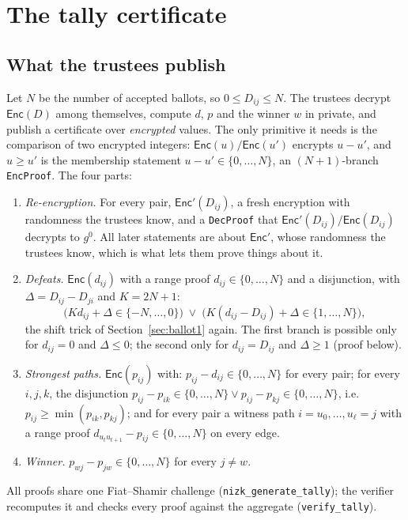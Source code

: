 \documentclass[11pt,a4paper]{article}
\newcommand{\Enc}{\mathsf{Enc}}
\newcommand{\rocq}[1]{\texttt{#1}}
\theoremstyle{remark}
\begin{document}
\section{The tally certificate}\label{sec:tally}

\subsection{What the trustees publish}
Let $N$ be the number of accepted ballots, so $0 \le D_{ij} \le N$. The
trustees decrypt $\Enc(D)$ among themselves, compute $d$, $p$ and the
winner $w$ in private, and publish a certificate over \emph{encrypted}
values. The only primitive it needs is the comparison of two encrypted
integers: $\Enc(u) / \Enc(u')$ encrypts $u - u'$, and $u \ge u'$ is the
membership statement $u - u' \in \{0, \ldots, N\}$, an $(N+1)$-branch
\rocq{EncProof}. The four parts:
\begin{enumerate}[nosep]
  \item[(i)] \emph{Re-encryption.} For every pair, $\Enc'(D_{ij})$, a fresh
  encryption with randomness the trustees know, and a \rocq{DecProof} that
  $\Enc'(D_{ij}) / \Enc(D_{ij})$ decrypts to $g^0$. All later statements
  are about $\Enc'$, whose randomness the trustees know, which is what
  lets them prove things about it.
  \item[(ii)] \emph{Defeats.} $\Enc(d_{ij})$ with a range proof $d_{ij} \in
  \{0, \ldots, N\}$ and a disjunction, with $\Delta = D_{ij} - D_{ji}$ and
  $K = 2N + 1$:
  \[
    \big(K d_{ij} + \Delta \in \{-N, \ldots, 0\}\big) \;\vee\;
    \big(K (d_{ij} - D_{ij}) + \Delta \in \{1, \ldots, N\}\big),
  \]
  the shift trick of Section~\ref{sec:ballot1} again. The first branch is
  possible only for $d_{ij} = 0$ and $\Delta \le 0$; the second only for
  $d_{ij} = D_{ij}$ and $\Delta \ge 1$ (proof below).
  \item[(iii)] \emph{Strongest paths.} $\Enc(p_{ij})$ with: $p_{ij} -
  d_{ij} \in \{0, \ldots, N\}$ for every pair; for every $i, j, k$, the
  disjunction $p_{ij} - p_{ik} \in \{0, \ldots, N\} \vee p_{ij} - p_{kj}
  \in \{0, \ldots, N\}$, i.e.\ $p_{ij} \ge \min(p_{ik}, p_{kj})$; and for
  every pair a witness path $i = u_0, \ldots, u_\ell = j$ with a range
  proof $d_{u_t u_{t+1}} - p_{ij} \in \{0, \ldots, N\}$ on every edge.
  \item[(iv)] \emph{Winner.} $p_{wj} - p_{jw} \in \{0, \ldots, N\}$ for
  every $j \ne w$.
\end{enumerate}
All proofs share one Fiat--Shamir challenge
(\rocq{nizk\_generate\_tally}); the verifier recomputes it and checks every
proof against the aggregate (\rocq{verify\_tally}).
\end{document}
